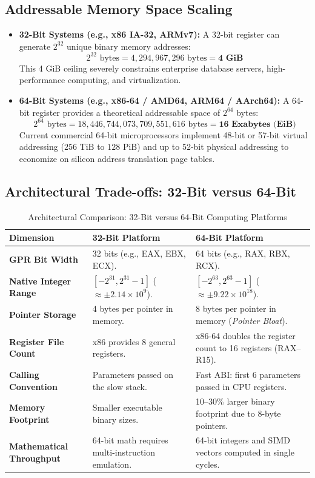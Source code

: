 \subsection{Addressable Memory Space Scaling}
\begin{itemize}
    \item \textbf{32-Bit Systems (e.g., x86 IA-32, ARMv7):}
    A 32-bit register can generate $2^{32}$ unique binary memory addresses:
    \[ 2^{32} \text{ bytes} = 4,294,967,296\text{ bytes} = \mathbf{4\text{ GiB}} \]
    This 4 GiB ceiling severely constrains enterprise database servers, high-performance computing, and virtualization.
    \item \textbf{64-Bit Systems (e.g., x86-64 / AMD64, ARM64 / AArch64):}
    A 64-bit register provides a theoretical addressable space of $2^{64}$ bytes:
    \[ 2^{64} \text{ bytes} = 18,446,744,073,709,551,616\text{ bytes} = \mathbf{16\text{ Exabytes (EiB)}} \]
    Current commercial 64-bit microprocessors implement 48-bit or 57-bit virtual addressing ($256\text{ TiB}$ to $128\text{ PiB}$) and up to 52-bit physical addressing to economize on silicon address translation page tables.
\end{itemize}

\subsection{Architectural Trade-offs: 32-Bit versus 64-Bit}
\begin{table}[htbp]
\centering
\small
\caption{Architectural Comparison: 32-Bit versus 64-Bit Computing Platforms}
\label{tab:32bit_vs_64bit}
\begin{tabularx}{\textwidth}{l X X}
\toprule
\textbf{Dimension} & \textbf{32-Bit Platform} & \textbf{64-Bit Platform} \\
\midrule
\textbf{GPR Bit Width} & 32 bits (e.g., EAX, EBX, ECX). & 64 bits (e.g., RAX, RBX, RCX). \\
\textbf{Native Integer Range} & $[-2^{31}, 2^{31}-1]$ ($\approx \pm 2.14\times 10^9$). & $[-2^{63}, 2^{63}-1]$ ($\approx \pm 9.22\times 10^{18}$). \\
\textbf{Pointer Storage} & 4 bytes per pointer in memory. & 8 bytes per pointer in memory (\textit{Pointer Bloat}). \\
\textbf{Register File Count} & x86 provides 8 general registers. & x86-64 doubles the register count to 16 registers (RAX--R15). \\
\textbf{Calling Convention} & Parameters passed on the slow stack. & Fast ABI: first 6 parameters passed in CPU registers. \\
\textbf{Memory Footprint} & Smaller executable binary sizes. & 10--30\% larger binary footprint due to 8-byte pointers. \\
\textbf{Mathematical Throughput} & 64-bit math requires multi-instruction emulation. & 64-bit integers and SIMD vectors computed in single cycles. \\
\bottomrule
\end{tabularx}
\end{table}




